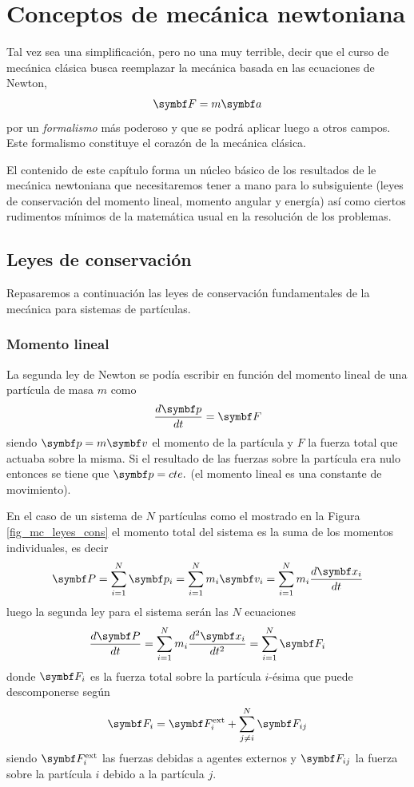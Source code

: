 \documentclass[10pt,oneside]{CBFT_book}
\begin{document}
\chapter{Conceptos de mecánica newtoniana}

Tal vez sea una simplificación, pero no una muy terrible, decir que el curso de mecánica clásica
busca reemplazar la mecánica basada en las ecuaciones de Newton,
\[
	\vb{F} = m \vb{a} 
\]
por un \emph{formalismo} más poderoso y que se podrá aplicar luego a otros campos.
Este formalismo constituye el corazón de la mecánica clásica.

El contenido de este capítulo forma un núcleo básico de los resultados de le mecánica newtoniana que necesitaremos 
tener a mano para lo subsiguiente (leyes de conservación del momento lineal, momento angular y energía) así como 
ciertos rudimentos mínimos de la matemática usual en la resolución de los problemas.

\section{Leyes de conservación}

Repasaremos a continuación las leyes de conservación fundamentales de la mecánica para sistemas de partículas.

\subsection{Momento lineal}

La segunda ley de Newton se podía escribir en función del momento lineal de una partícula de masa $ m $ como
\[
	\dtot{\vb{p}}{t} = \vb{F}
\]
siendo $ \vb{p} = m\vb{v} $ el momento de la partícula y $ F $ la fuerza total que actuaba sobre la misma.
Si el resultado de las fuerzas sobre la partícula era nulo entonces se tiene que $ \vb{p} = cte. $ (el momento lineal 
es una constante de movimiento).

En el caso de un sistema de $N$ partículas como el mostrado en la Figura \ref{fig_mc_leyes_cons} el momento total del 
sistema es la suma de los momentos individuales, es decir
\[
	\vb{P} = \Sum{i=1}{N} \vb{p}_i = \Sum{i=1}{N} m_i \vb{v}_i = \Sum{i=1}{N} m_i \dtot{\vb{x}_i}{t}
\]
luego la segunda ley para el sistema serán las $ N $ ecuaciones
\[
	\dtot{\vb{P}}{t} = \Sum{i=1}{N} m_i \dtot[2]{\vb{x}_i}{t} = \Sum{i=1}{N} \vb{F}_i
\]
donde $ \vb{F}_i$ es la fuerza total sobre la partícula $i$-ésima que puede descomponerse según
\[
	\vb{F}_i = \vb{F}_i^\text{ext} + \Sum{ j \neq i }{N} \vb{F}_{ij}
\]
siendo $ \vb{F}_i^\text{ext} $ las fuerzas debidas a agentes externos y $\vb{F}_{ij}$ la fuerza sobre la partícula $i$ 
debido a la partícula $j$.
\end{document}
